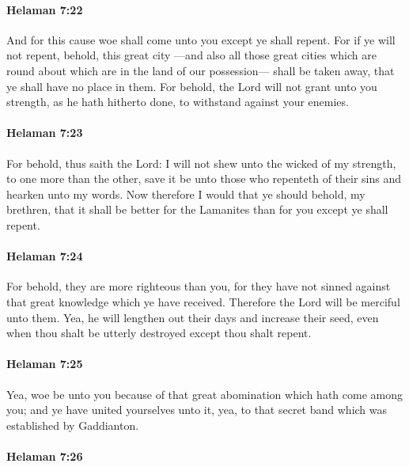 		\paragraph{Helaman 7:22} %
			\label{HELAMAN-7-22}

			And for this cause
			woe shall come unto you except ye shall repent.
			For if ye will not repent,
			behold, this great city
			---and also all those great cities which are round about
			which are in the land of our possession---
			shall be taken away,
			that ye shall have no place in them.
			For behold, the Lord will not grant unto you strength,
			as he hath hitherto done,
			to withstand against your enemies.

		\paragraph{Helaman 7:23} %
			\label{HELAMAN-7-23}

			For behold, thus saith the Lord:
			I will not shew unto the wicked of my strength,
			to one more than the other,
			save it be unto those who repenteth of their sins and hearken unto my words.
			Now therefore I would that ye should behold, my brethren,
			that it shall be better for the Lamanites than for you except ye shall repent.

		\paragraph{Helaman 7:24} %
			\label{HELAMAN-7-24}

			For behold, they are more righteous than you,
			for they have not sinned against that great knowledge which ye have received.
			Therefore the Lord will be merciful unto them.
			Yea, he will lengthen out their days and increase their seed,
			even when thou shalt be utterly destroyed except thou shalt repent.

		\paragraph{Helaman 7:25} %
			\label{HELAMAN-7-25}

			Yea, woe be unto you because of that great abomination
			which hath come among you;
			and ye have united yourselves unto it,
			yea, to that secret band which was established by Gaddianton.

		\paragraph{Helaman 7:26} %
			\label{HELAMAN-7-26}

